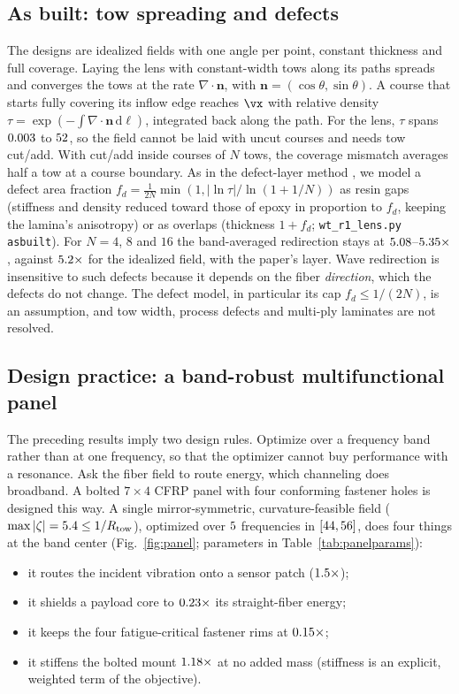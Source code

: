 \subsection{As built: tow spreading and defects}\label{sec:asbuilt}
The designs are idealized fields with one angle per point, constant thickness and full coverage. Laying
the lens with constant-width tows along its paths spreads and converges the tows at the rate
$\nabla\!\cdot\bm n$, with $\bm n=(\cos\theta,\sin\theta)$. A course that starts fully covering its inflow edge reaches
$\vx$ with relative density $\tau=\exp(-\int\nabla\!\cdot\bm n\,\mathrm{d}\ell)$, integrated back along the path. For the
lens, $\tau$ spans $0.003$ to $52$, so the field cannot be laid with uncut courses and needs tow cut/add.
With cut/add inside courses of $N$ tows, the coverage mismatch averages half a tow at a course boundary. As in
the defect-layer method \cite{fayazbakhsh2013}, we model a defect area fraction
$f_d=\tfrac{1}{2N}\min(1,|\ln\tau|/\ln(1+1/N))$ as resin gaps (stiffness and density reduced toward those of epoxy in proportion to $f_d$, keeping the lamina's anisotropy) or as overlaps
(thickness $1+f_d$; \texttt{wt\_r1\_lens.py asbuilt}). For $N=4$, $8$ and $16$ the band-averaged redirection
stays at $5.08$--$5.35\times$, against $5.2\times$ for the idealized field, with the
paper's layer. Wave redirection is insensitive to such defects because it depends on the fiber
\emph{direction}, which the defects do not change. The defect model, in particular its cap
$f_d\le1/(2N)$, is an assumption, and tow width, process defects and multi-ply laminates are not
resolved.

\subsection{Design practice: a band-robust multifunctional panel}\label{sec:panel}
The preceding results imply two design rules. Optimize over a frequency band rather than at one
frequency, so that the optimizer cannot buy performance with a resonance. Ask the fiber field to route
energy, which channeling does broadband. A bolted $7\times4$ CFRP panel with four conforming fastener holes
is designed this way. A single mirror-symmetric, curvature-feasible field ($\max|\zeta|=5.4\le1/R_{\rm
tow}$), optimized over $5$ frequencies in $[44,56]$, does four things at the band center
(Fig.~\ref{fig:panel}; parameters in Table~\ref{tab:panelparams}):
\begin{itemize}[itemsep=1pt]
\item it routes the incident vibration onto a sensor patch ($1.5\times$);
\item it shields a payload core to $0.23\times$ its straight-fiber energy;
\item it keeps the four fatigue-critical fastener rims at $0.15\times$;
\item it stiffens the bolted mount $1.18\times$ at no added mass (stiffness is an explicit, weighted term of
  the objective).
\end{itemize}
